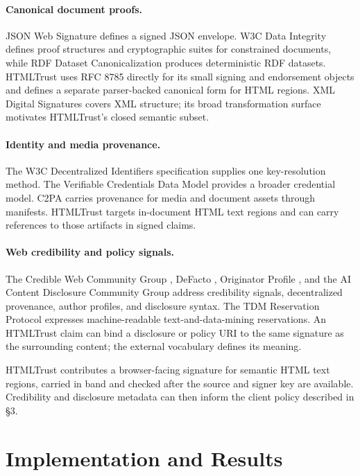 \documentclass{article}
\begin{document}
\paragraph{Canonical document proofs.} JSON Web Signature \cite{JWS} defines a signed JSON envelope. W3C Data Integrity \cite{VCDataIntegrity} defines proof structures and cryptographic suites for constrained documents, while RDF Dataset Canonicalization \cite{RDFCanon} produces deterministic RDF datasets. HTMLTrust uses RFC 8785 directly for its small signing and endorsement objects and defines a separate parser-backed canonical form for HTML regions. XML Digital Signatures \cite{XMLDSIG} covers XML structure; its broad transformation surface motivates HTMLTrust's closed semantic subset.

\paragraph{Identity and media provenance.} The W3C Decentralized Identifiers specification \cite{DIDSpec} supplies one key-resolution method. The Verifiable Credentials Data Model \cite{VCDataModel} provides a broader credential model. C2PA \cite{C2PA} carries provenance for media and document assets through manifests. HTMLTrust targets in-document HTML text regions and can carry references to those artifacts in signed claims.

\paragraph{Web credibility and policy signals.} The Credible Web Community Group \cite{CredibleWeb}, DeFacto \cite{DeFacto}, Originator Profile \cite{OriginatorProfile}, and the AI Content Disclosure Community Group \cite{AIContentDisclosure} address credibility signals, decentralized provenance, author profiles, and disclosure syntax. The TDM Reservation Protocol \cite{TDMRep} expresses machine-readable text-and-data-mining reservations. An HTMLTrust claim can bind a disclosure or policy URI to the same signature as the surrounding content; the external vocabulary defines its meaning.

HTMLTrust contributes a browser-facing signature for semantic HTML text regions, carried in band and checked after the source and signer key are available. Credibility and disclosure metadata can then inform the client policy described in \S3.

\section{Implementation and Results}
\label{sec:results}
\end{document}
